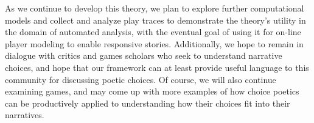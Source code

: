 \documentclass[arts,article,accept,moreauthors,pdftex,10pt,a4paper]{Definitions/mdpi}
\begin{document}
As we continue to develop this theory, we plan to explore further computational models and collect and analyze play traces to demonstrate the theory's utility in the domain of automated analysis, with the eventual goal of using it for on-line player modeling to enable responsive stories.
%
Additionally, we hope to remain in dialogue with critics and games scholars who seek to understand narrative choices, and hope that our framework can at least provide useful language to this community for discussing poetic choices.
%
Of course, we will also continue examining games, and may come up with more examples of how choice poetics can be productively applied to understanding how their choices fit into their narratives.

\vspace{6pt} 




\end{document}
